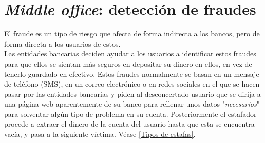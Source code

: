 \documentclass[12pt, a4paper]{report}
\begin{document}
\chapter{\textit{Middle office}: detección de fraudes}
El fraude es un tipo de riesgo que afecta de forma indirecta a los bancos, pero de forma directa a los usuarios de estos.\\
Las entidades bancarias deciden ayudar a los usuarios a identificar estos fraudes para que ellos se sientan más seguros en depositar su dinero en ellos, en vez de tenerlo guardado en efectivo.
\newline
\newline
Estos fraudes normalmente se basan en un mensaje de teléfono (SMS), en un correo electrónico o en redes sociales en el que se hacen pasar por las entidades bancarias y piden al desconcertado usuario que se dirija a una página web aparentemente de su banco para rellenar unos datos "\textit{necesarios}" para solventar algún tipo de problema en su cuenta. Posteriormente el estafador procede a extraer el dinero de la cuenta del usuario hasta que esta se encuentra vacía, y pasa a la siguiente víctima. Véase \ref{Tipos de estafas}.
\newline
\end{document}
